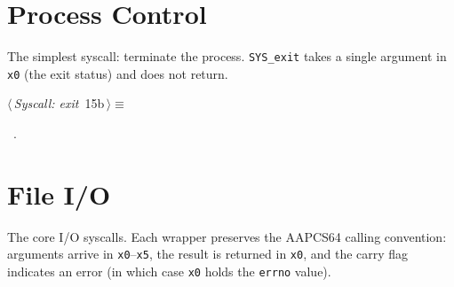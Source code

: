 \documentclass[11pt,a4paper,twoside,openright,DIV=15]{scrbook}
\theoremstyle{definition}
\theoremstyle{plain}
\theoremstyle{remark}
\newcommand{\reg}[1]{\texttt{#1}}
\begin{document}
\section{Process Control}

The simplest syscall: terminate the process.  \texttt{SYS\_exit}
takes a single argument in \reg{x0} (the exit status) and does
not return.

\begin{flushleft} \small
\begin{minipage}{\linewidth}\label{scrap3}\raggedright\small
{} $\langle\,${\itshape Syscall: exit}\nobreak\ {\footnotesize {15b}}$\,\rangle\equiv$
\vspace{-1ex}
\vspace{-1.5ex}
\footnotesize
\begin{list}{}{\setlength{\itemsep}{-\parsep}\setlength{\itemindent}{-\leftmargin}}
\item \NWtxtMacroRefIn\ .

\item{}
\end{list}
\end{minipage}\vspace{4ex}
\end{flushleft}
\section{File I/O}

The core I/O syscalls.  Each wrapper preserves the AAPCS64 calling
convention: arguments arrive in \reg{x0}--\reg{x5}, the result is
returned in \reg{x0}, and the carry flag indicates an error (in which
case \reg{x0} holds the \texttt{errno} value).
\end{document}
